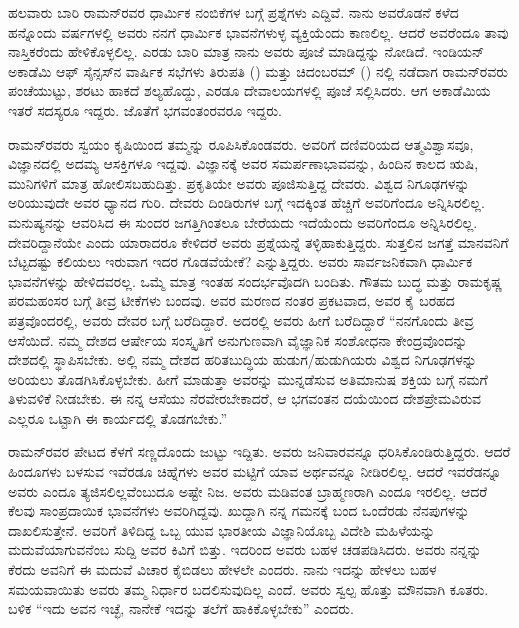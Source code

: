 
ಹಲವಾರು ಬಾರಿ ರಾಮನ್‍ರವರ ಧಾರ್ಮಿಕ ನಂಬಿಕೆಗಳ ಬಗ್ಗೆ ಪ್ರಶ್ನೆಗಳು ಎದ್ದಿವೆ. ನಾನು ಅವರೊಡನೆ ಕಳೆದ ಹನ್ನೊಂದು ವರ್ಷಗಳಲ್ಲಿ ಅವರು ನನಗೆ ಧಾರ್ಮಿಕ ಭಾವನೆಗಳುಳ್ಳ ವ್ಯಕ್ತಿಯೆಂದು ಕಾಣಲಿಲ್ಲ. ಆದರೆ ಅವರೆಂದೂ ತಾವು ನಾಸ್ತಿಕರೆಂದು ಹೇಳಿಕೊಳ್ಳಲಿಲ್ಲ. ಎರಡು ಬಾರಿ ಮಾತ್ರ ನಾನು ಅವರು ಪೂಜೆ ಮಾಡಿದ್ದನ್ನು ನೋಡಿದೆ. ಇಂಡಿಯನ್ ಅಕಾಡೆಮಿ ಆಫ್ ಸೈನ್ಸಸ್‍ನ ವಾರ್ಷಿಕ ಸಭೆಗಳು ತಿರುಪತಿ () ಮತ್ತು ಚಿದಂಬರಮ್ () ನಲ್ಲಿ ನಡೆದಾಗ ರಾಮನ್‍ರವರು ಪಂಚೆಯುಟ್ಟು, ಶರಟು ಹಾಕದೆ ಶಲ್ಯಹೊದ್ದು, ಎರಡೂ ದೇವಾಲಯಗಳಲ್ಲಿ ಪೂಜೆ ಸಲ್ಲಿಸಿದರು. ಆಗ ಅಕಾಡೆಮಿಯ ಇತರೆ ಸದಸ್ಯರೂ ಇದ್ದರು. ಜೊತೆಗೆ ಭಗವಂತಂರವರೂ ಇದ್ದರು.

ರಾಮನ್‍ರವರು ಸ್ವಯಂ ಕೃಷಿಯಿಂದ ತಮ್ಮನ್ನು ರೂಪಿಸಿಕೊಂಡವರು. ಅವರಿಗೆ ದಣಿವರಿಯದ ಆತ್ಮವಿಶ್ವಾಸವೂ, ವಿಜ್ಞಾನದಲ್ಲಿ ಅದಮ್ಯ ಆಸಕ್ತಿಗಳೂ ಇದ್ದವು. ವಿಜ್ಞಾನಕ್ಕೆ ಅವರ ಸಮರ್ಪಣಾಭಾವವನ್ನು, ಹಿಂದಿನ ಕಾಲದ ಋಷಿ, ಮುನಿಗಳಿಗೆ ಮಾತ್ರ ಹೋಲಿಸಬಹುದಿತ್ತು. ಪ್ರಕೃತಿಯೇ ಅವರು ಪೂಜಿಸುತ್ತಿದ್ದ ದೇವರು. ವಿಶ್ವದ ನಿಗೂಢಗಳನ್ನು ಅರಿಯುವುದೇ ಅವರ ಧ್ಯಾನದ ಗುರಿ. ದೇವರು ದಿಂಡಿರುಗಳ ಬಗ್ಗೆ ಇದಕ್ಕಿಂತ ಹೆಚ್ಚಿಗೆ ಅವರಿಗೆಂದೂ ಅನ್ನಿಸಿರಲಿಲ್ಲ. ಮನುಷ್ಯನನ್ನು ಆವರಿಸಿದ ಈ ಸುಂದರ ಜಗತ್ತಿಗಿಂತಲೂ ಬೇರೆಯದು ಇದೆಯೆಂದು ಅವರಿಗೆಂದೂ ಅನ್ನಿಸಿರಲಿಲ್ಲ. ದೇವರಿದ್ದಾನೆಯೇ ಎಂದು ಯಾರಾದರೂ ಕೇಳಿದರೆ ಅವರು ಪ್ರಶ್ನೆಯನ್ನೆ ತಳ್ಳಿಹಾಕುತ್ತಿದ್ದರು. ಸುತ್ತಲಿನ ಜಗತ್ತೆ ಮಾನವನಿಗೆ ಬೆಟ್ಟದಷ್ಟು ಕಲಿಯಲು ಇರುವಾಗ ಇದರ ಗೊಡವೆಯೇಕೆ? ಎನ್ನುತ್ತಿದ್ದರು. ಅವರು ಸಾರ್ವಜನಿಕವಾಗಿ ಧಾರ್ಮಿಕ ಭಾವನೆಗಳನ್ನು ಹೇಳಿದವರಲ್ಲ. ಒಮ್ಮೆ ಮಾತ್ರ ಇಂತಹ ಸಂದರ್ಭವೊದಗಿ ಬಂದಿತು. ಗೌತಮ ಬುದ್ಧ ಮತ್ತು ರಾಮಕೃಷ್ಣ ಪರಮಹಂಸರ ಬಗ್ಗೆ ತೀವ್ರ ಟೀಕೆಗಳು ಬಂದವು. ಅವರ ಮರಣದ ನಂತರ ಪ್ರಕಟವಾದ, ಅವರ ಕೈ ಬರಹದ ಪತ್ರವೊಂದರಲ್ಲಿ, ಅವರು ದೇವರ ಬಗ್ಗೆ ಬರೆದಿದ್ದಾರೆ. ಅದರಲ್ಲಿ ಅವರು ಹೀಗೆ ಬರೆದಿದ್ದಾರೆ “ನನಗೊಂದು ತೀವ್ರ ಆಸೆಯಿದೆ. ನಮ್ಮ ದೇಶದ ಆರ್ಷೇಯ ಸಂಸ್ಕೃತಿಗೆ ಅನುಗುಣವಾಗಿ ವೈಜ್ಞಾನಿಕ ಸಂಶೋಧನಾ ಕೇಂದ್ರವೊಂದನ್ನು ದೇಶದಲ್ಲಿ ಸ್ಥಾಪಿಸಬೇಕು. ಅಲ್ಲಿ ನಮ್ಮ ದೇಶದ ಹರಿತಬುದ್ಧಿಯ ಹುಡುಗ/ಹುಡುಗಿಯರು ವಿಶ್ವದ ನಿಗೂಢಗಳನ್ನು ಅರಿಯಲು ತೊಡಗಿಸಿಕೊಳ್ಳಬೇಕು. ಹೀಗೆ ಮಾಡುತ್ತಾ ಅವರನ್ನು ಮುನ್ನಡೆಸುವ ಅತಿಮಾನುಷ ಶಕ್ತಿಯ ಬಗ್ಗೆ ನಮಗೆ ತಿಳುವಳಿಕೆ ನೀಡಬೇಕು. ಈ ನನ್ನ ಆಸೆಯು ನೆರವೇರಬೇಕಾದರೆ, ಆ ಭಗವಂತನ ದಯೆಯಿಂದ ದೇಶಪ್ರೇಮವಿರುವ ಎಲ್ಲರೂ ಒಟ್ಟಾಗಿ ಈ ಕಾರ್ಯದಲ್ಲಿ ತೊಡಗಬೇಕು.”

ರಾಮನ್‍ರವರ ಪೇಟದ ಕೆಳಗೆ ಸಣ್ಣದೊಂದು ಜುಟ್ಟು ಇದ್ದಿತು. ಅವರು ಜನಿವಾರವನ್ನೂ ಧರಿಸಿಕೊಂಡಿರುತ್ತಿದ್ದರು. ಆದರೆ ಹಿಂದೂಗಳು ಬಳಸುವ ಇವೆರಡೂ ಚಿಹ್ನೆಗಳು ಅವರ ಮಟ್ಟಿಗೆ ಯಾವ ಅರ್ಥವನ್ನೂ ನೀಡಿರಲಿಲ್ಲ. ಆದರೆ ಇವರೆಡನ್ನೂ ಅವರು ಎಂದೂ ತ್ಯಜಿಸಲಿಲ್ಲವೆಂಬುದೂ ಅಷ್ಟೇ ನಿಜ. ಅವರು ಮಡಿವಂತ ಬ್ರಾಹ್ಮಣರಾಗಿ ಎಂದೂ ಇರಲಿಲ್ಲ. ಆದರೆ ಕೆಲವು ಸಾಂಪ್ರದಾಯಿಕ ಭಾವನೆಗಳು ಅವರಿಗಿದ್ದವು. ಖುದ್ದಾಗಿ ನನ್ನ ಗಮನಕ್ಕೆ ಬಂದ ಒಂದೆರಡು ನೆನಪುಗಳನ್ನು ದಾಖಲಿಸುತ್ತೇನೆ. ಅವರಿಗೆ ತಿಳಿದಿದ್ದ ಒಬ್ಬ ಯುವ ಭಾರತೀಯ ವಿಜ್ಞಾನಿಯೊಬ್ಬ ವಿದೇಶಿ ಮಹಿಳೆಯನ್ನು ಮದುವೆಯಾಗುವನೆಂಬ ಸುದ್ದಿ ಅವರ ಕಿವಿಗೆ ಬಿತ್ತು. ಇದರಿಂದ ಅವರು ಬಹಳ ಚಡಪಡಿಸಿದರು. ಅವರು ನನ್ನನ್ನು ಕೆರದು ಅವನಿಗೆ ಈ ಮದುವೆ ವಿಚಾರ ಕೈಬಿಡಲು ಹೇಳಲೇ ಎಂದರು. ನಾನು ಇದನ್ನು ಹೇಳಲು ಬಹಳ ಸಮಯವಾಯಿತು ಅವರು ತಮ್ಮ ನಿರ್ಧಾರ ಬದಲಿಸುವುದಿಲ್ಲ ಎಂದೆ. ಅವರು ಸ್ವಲ್ಪ ಹೊತ್ತು ಮೌನವಾಗಿ ಕೂತರು. ಬಳಿಕ “ಇದು ಅವನ ಇಚ್ಛೆ, ನಾನೇಕೆ ಇದನ್ನು ತಲೆಗೆ ಹಾಕಿಕೊಳ್ಳಬೇಕು” ಎಂದರು.

